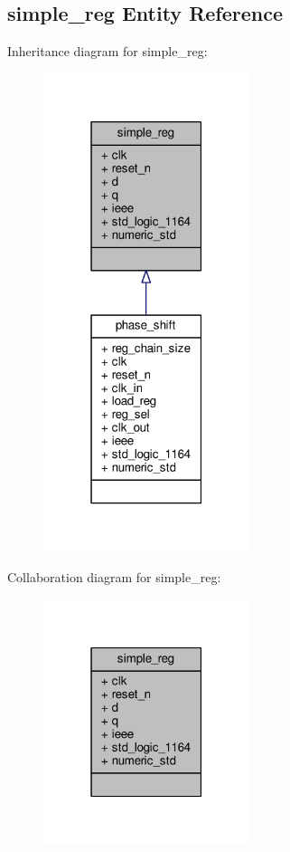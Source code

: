 \subsection{simple\+\_\+reg Entity Reference}
\label{classsimple__reg}


Inheritance diagram for simple\+\_\+reg\+:\nopagebreak
\begin{figure}[H]
\begin{center}
\leavevmode
\includegraphics[width=171pt]{d8/dd4/classsimple__reg__inherit__graph}
\end{center}
\end{figure}


Collaboration diagram for simple\+\_\+reg\+:\nopagebreak
\begin{figure}[H]
\begin{center}
\leavevmode
\includegraphics[width=171pt]{d7/ddd/classsimple__reg__coll__graph}
\end{center}
\end{figure}
